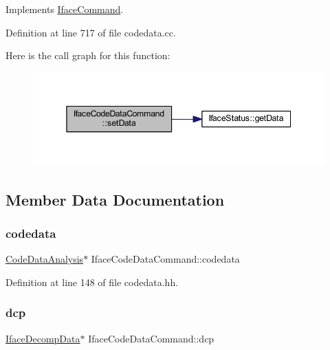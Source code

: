 Implements \mbox{\hyperlink{class_iface_command_ad0a0ba80d392ef1346c43283a8c3ca90}{Iface\+Command}}.



Definition at line 717 of file codedata.\+cc.

Here is the call graph for this function\+:
\nopagebreak
\begin{figure}[H]
\begin{center}
\leavevmode
\includegraphics[width=345pt]{class_iface_code_data_command_a778193a98c1a977a3635e63eb15a26d0_cgraph}
\end{center}
\end{figure}


\subsection{Member Data Documentation}
\mbox{\label{class_iface_code_data_command_a9b39ac61629b38576d8aabb5b17fdd4f}} 
\subsubsection{\texorpdfstring{codedata}{codedata}}
{\footnotesize\ttfamily \mbox{\hyperlink{class_code_data_analysis}{Code\+Data\+Analysis}}$\ast$ Iface\+Code\+Data\+Command\+::codedata\hspace{0.3cm}{\ttfamily [protected]}}



Definition at line 148 of file codedata.\+hh.

\mbox{\label{class_iface_code_data_command_a81a5f766c3d62c3979a32b5ebb25360b}} 
\subsubsection{\texorpdfstring{dcp}{dcp}}
{\footnotesize\ttfamily \mbox{\hyperlink{class_iface_decomp_data}{Iface\+Decomp\+Data}}$\ast$ Iface\+Code\+Data\+Command\+::dcp\hspace{0.3cm}{\ttfamily [protected]}}



